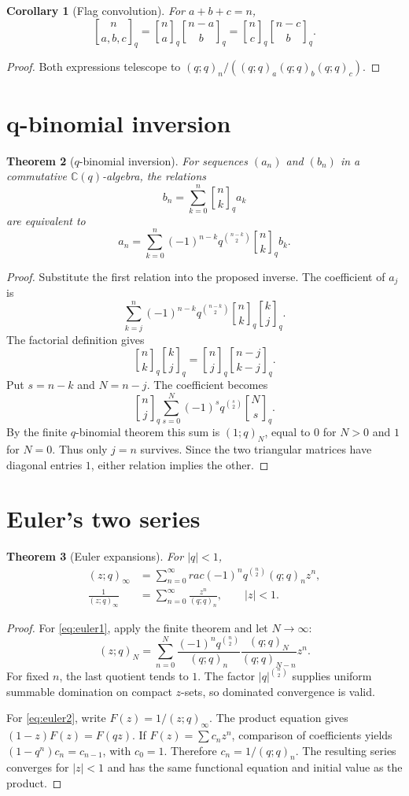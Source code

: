 \documentclass[11pt]{article}
\numberwithin{equation}{section}
\newtheorem{theorem}{Theorem}[section]
\newtheorem{corollary}[theorem]{Corollary}
\theoremstyle{definition}
\newcommand{\qbinom}[2]{\genfrac{[}{]}{0pt}{}{#1}{#2}_{q}}
\newcommand{\C}{\mathbb C}
\begin{document}
\begin{corollary}[Flag convolution]
For $a+b+c=n$,
\[
\genfrac{[}{]}{0pt}{}{n}{a,b,c}_q
=\genfrac{[}{]}{0pt}{}{n}{a}_q
 \genfrac{[}{]}{0pt}{}{n-a}{b}_q
=\genfrac{[}{]}{0pt}{}{n}{c}_q
 \genfrac{[}{]}{0pt}{}{n-c}{b}_q.
\]
\end{corollary}
\begin{proof}
Both expressions telescope to $(q;q)_n/((q;q)_a(q;q)_b(q;q)_c)$.
\end{proof}

\section{q-binomial inversion}
\begin{theorem}[$q$-binomial inversion]
For sequences $(a_n)$ and $(b_n)$ in a commutative $\C(q)$-algebra, the relations
\[
b_n=\sum_{k=0}^n\qbinom nk a_k
\]
are equivalent to
\[
a_n=\sum_{k=0}^n(-1)^{n-k}q^{\binom{n-k}{2}}\qbinom nk b_k.
\]
\end{theorem}
\begin{proof}
Substitute the first relation into the proposed inverse.  The coefficient of $a_j$ is
\[
\sum_{k=j}^n(-1)^{n-k}q^{\binom{n-k}{2}}
\qbinom nk\qbinom kj.
\]
The factorial definition gives
\[
\qbinom nk\qbinom kj=\qbinom nj\genfrac{[}{]}{0pt}{}{n-j}{k-j}_q.
\]
Put $s=n-k$ and $N=n-j$.  The coefficient becomes
\[
\qbinom nj\sum_{s=0}^{N}(-1)^sq^{\binom s2}\genfrac{[}{]}{0pt}{}{N}{s}_q.
\]
By the finite $q$-binomial theorem this sum is $(1;q)_N$, equal to $0$ for $N>0$ and $1$ for $N=0$.  Thus only $j=n$ survives.  Since the two triangular matrices have diagonal entries $1$, either relation implies the other.
\end{proof}

\section{Euler's two series}
\begin{theorem}[Euler expansions]
For $|q|<1$,
\begin{align}
(z;q)_\infty&=\sum_{n=0}^{\infty}rac{(-1)^nq^{\binom n2}}{(q;q)_n}z^n,\label{eq:euler1}\\
\frac1{(z;q)_\infty}&=\sum_{n=0}^{\infty}\frac{z^n}{(q;q)_n},\qquad |z|<1.\label{eq:euler2}
\end{align}
\end{theorem}
\begin{proof}
For \eqref{eq:euler1}, apply the finite theorem and let $N\to\infty$:
\[
(z;q)_N=\sum_{n=0}^N\frac{(-1)^nq^{\binom n2}}{(q;q)_n}
\frac{(q;q)_N}{(q;q)_{N-n}}z^n.
\]
For fixed $n$, the last quotient tends to $1$.  The factor $|q|^{\binom n2}$ supplies uniform summable domination on compact $z$-sets, so dominated convergence is valid.

For \eqref{eq:euler2}, write $F(z)=1/(z;q)_\infty$.  The product equation gives $(1-z)F(z)=F(qz)$.  If $F(z)=\sum c_nz^n$, comparison of coefficients yields $(1-q^n)c_n=c_{n-1}$, with $c_0=1$.  Therefore $c_n=1/(q;q)_n$.  The resulting series converges for $|z|<1$ and has the same functional equation and initial value as the product.
\end{proof}
\end{document}
